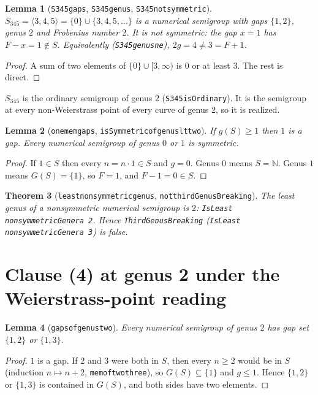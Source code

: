 \documentclass[11pt]{article}
\newtheorem{theorem}{Theorem}
\newtheorem{lemma}[theorem]{Lemma}
\theoremstyle{definition}
\theoremstyle{remark}
\renewcommand{\_}{\oldus\allowbreak}
\begin{document}
\begin{lemma}[\texttt{S345\_gaps}, \texttt{S345\_genus}, \texttt{S345\_not\_symmetric}]
$S_{345} = \langle 3,4,5\rangle = \{0\} \cup \{3,4,5,\dots\}$ is a numerical semigroup with gaps $\{1,2\}$,
genus $2$ and Frobenius number $2$. It is not symmetric: the gap $x=1$ has $F - x = 1 \notin S$.
Equivalently (\texttt{S345\_genus\_ne}), $2g = 4 \ne 3 = F+1$.
\end{lemma}
\begin{proof}
A sum of two elements of $\{0\}\cup[3,\infty)$ is $0$ or at least $3$. The rest is direct.
\end{proof}

$S_{345}$ is the ordinary semigroup of genus $2$ (\texttt{S345\_isOrdinary}). It is the semigroup at every
non-Weierstrass point of every curve of genus $2$, so it is realized.

\begin{lemma}[\texttt{one\_mem\_gaps}, \texttt{isSymmetric\_of\_genus\_lt\_two}]
If $g(S) \ge 1$ then $1$ is a gap. Every numerical semigroup of genus $0$ or $1$ is symmetric.
\end{lemma}
\begin{proof}
If $1\in S$ then every $n = n\cdot 1 \in S$ and $g=0$. Genus $0$ means $S = \mathbb{N}$. Genus $1$ means
$G(S)=\{1\}$, so $F=1$, and $F - 1 = 0 \in S$.
\end{proof}

\begin{theorem}[\texttt{least\_nonsymmetric\_genus}, \texttt{not\_thirdGenusBreaking}]\label{thm:least}
The least genus of a nonsymmetric numerical semigroup is $2$:
\texttt{IsLeast nonsymmetricGenera 2}. Hence \texttt{ThirdGenusBreaking}
(\texttt{IsLeast nonsymmetricGenera 3}) is false.
\end{theorem}

\section{Clause (4) at genus 2 under the Weierstrass-point reading}

\begin{lemma}[\texttt{gaps\_of\_genus\_two}]
Every numerical semigroup of genus $2$ has gap set $\{1,2\}$ or $\{1,3\}$.
\end{lemma}
\begin{proof}
$1$ is a gap. If $2$ and $3$ were both in $S$, then every $n\ge 2$ would be in $S$ (induction
$n \mapsto n+2$, \texttt{mem\_of\_two\_three}), so $G(S)\subseteq\{1\}$ and $g\le 1$. Hence $\{1,2\}$ or
$\{1,3\}$ is contained in $G(S)$, and both sides have two elements.
\end{proof}
\end{document}
